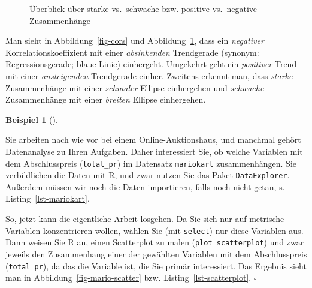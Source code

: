 \documentclass[
  letterpaper,
]{scrbook}
\theoremstyle{definition}
\newtheorem{example}{Beispiel}[chapter]
\theoremstyle{definition}
\theoremstyle{definition}
\theoremstyle{remark}
\begin{document}
\begin{figure}


\caption{\label{fig-cors2}Überblick über starke vs.~schwache bzw.
positive vs.~negative Zusammenhänge}

\end{figure}%

Man sieht in Abbildung~\ref{fig-cors} und Abbildung~\ref{fig-cors2},
dass ein \emph{negativer} Korrelationskoeffizient mit einer
\emph{absinkenden} Trendgerade (synonym: Regressionsgerade; blaue Linie)
einhergeht. Umgekehrt geht ein \emph{positiver} Trend mit einer
\emph{ansteigenden} Trendgerade einher. Zweitens erkennt man, dass
\emph{starke} Zusammenhänge mit einer \emph{schmaler} Ellipse
einhergehen und \emph{schwache} Zusammenhänge mit einer \emph{breiten}
Ellipse einhergehen.

\begin{example}[]\protect\hypertarget{exm-scatter}{}\label{exm-scatter}

Sie arbeiten nach wie vor bei einem Online-Auktionshaus, und manchmal
gehört Datenanalyse zu Ihren Aufgaben. Daher interessiert Sie, ob welche
Variablen mit dem Abschlusspreis (\texttt{total\_pr}) im Datensatz
\texttt{mariokart} zusammenhängen. Sie verbildlichen die Daten mit R,
und zwar nutzen Sie das Paket \texttt{DataExplorer}. Außerdem müssen wir
noch die Daten importieren, falls noch nicht getan, s.
Listing~\ref{lst-mariokart}.

So, jetzt kann die eigentliche Arbeit losgehen. Da Sie sich nur auf
metrische Variablen konzentrieren wollen, wählen Sie (mit
\texttt{select}) nur diese Variablen aus. Dann weisen Sie R an, einen
Scatterplot zu malen (\texttt{plot\_scatterplot}) und zwar jeweils den
Zusammenhang einer der gewählten Variablen mit dem Abschlusspreis
(\texttt{total\_pr}), da das die Variable ist, die Sie primär
interessiert. Das Ergebnis sieht man in
Abbildung~\ref{fig-mario-scatter} bzw. Listing~\ref{lst-scatterplot}.
\(\square\)

\end{example}
\end{document}
